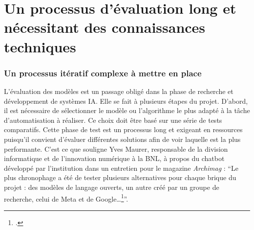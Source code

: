 \chapter{Un processus d'évaluation long et nécessitant des connaissances techniques}



\subsection{Un processus itératif complexe à mettre en place}

L'évaluation des modèles est un passage obligé dans la phase de recherche et développement de systèmes IA. Elle se fait à plusieurs étapes du projet. 
D'abord, il est nécessaire de sélectionner le modèle ou l'algorithme le plus adapté à la tâche d'automatisation à réaliser.
Ce choix doit être basé sur une série de tests comparatifs. Cette phase de test est un processus long et exigeant en ressources puisqu'il 
convient d'évaluer différentes solutions afin de voir laquelle est la plus performante. 
C'est ce que souligne Yves Maurer, responsable de la division informatique et de l'innovation numérique à la BNL, à propos du \gls{chatbot} développé par l'institution dans un entretien pour le magazine \emph{Archimag} : \enquote{Le plus chronophage a été de tester plusieurs alternatives pour chaque brique du projet : des modèles de langage ouverts, un autre créé par un groupe de recherche, celui de Meta et de Google\dots\footcite{noauthor_comment_nodate}}.

